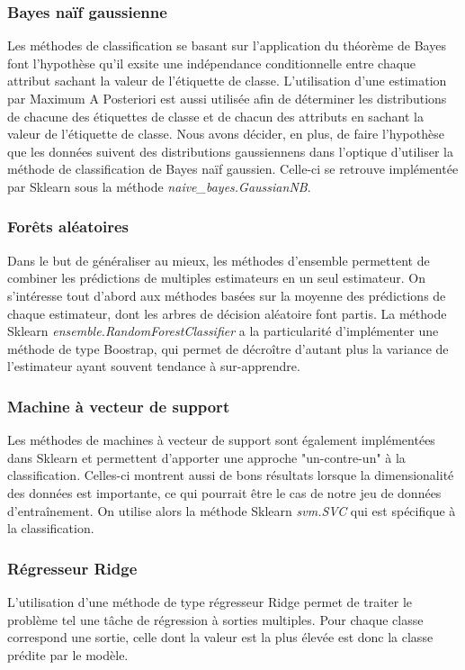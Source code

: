 \subsubsection*{Bayes naïf gaussienne}
Les méthodes de classification se basant sur l'application du théorème de Bayes font l'hypothèse qu'il exsite une indépendance conditionnelle entre chaque attribut sachant la valeur de l'étiquette de classe. L'utilisation d'une estimation par Maximum A Posteriori est aussi utilisée afin de déterminer les distributions de chacune des étiquettes de classe et de chacun des attributs en sachant la valeur de l'étiquette de classe. Nous avons décider, en plus, de faire l'hypothèse que les données suivent des distributions gaussiennens dans l'optique d'utiliser la méthode de classification de Bayes naïf gaussien. Celle-ci se retrouve implémentée par Sklearn sous la méthode \emph{naive\_bayes.GaussianNB}.

\subsubsection*{Forêts aléatoires}
Dans le but de généraliser au mieux, les méthodes d'ensemble permettent de combiner les prédictions de multiples estimateurs en un seul estimateur. On s'intéresse tout d'abord aux méthodes basées sur la moyenne des prédictions de chaque estimateur, dont les arbres de décision aléatoire font partis. 
La méthode Sklearn \emph{ensemble.RandomForestClassifier} a la particularité d'implémenter une méthode de type Boostrap, qui permet de décroître d'autant plus la variance de l'estimateur ayant souvent tendance à sur-apprendre.

\subsubsection*{Machine à vecteur de support}
Les méthodes de machines à vecteur de support sont également implémentées dans Sklearn et permettent d'apporter une approche "un-contre-un" à la classification. Celles-ci montrent aussi de bons résultats lorsque la dimensionalité des données est importante, ce qui pourrait être le cas de notre jeu de données d'entraînement. On utilise alors la méthode Sklearn \emph{svm.SVC} qui est spécifique à la classification.

\subsubsection*{Régresseur Ridge}
L'utilisation d'une méthode de type régresseur Ridge permet de traiter le problème tel une tâche de régression à sorties multiples. Pour chaque classe correspond une sortie, celle dont la valeur est la plus élevée est donc la classe prédite par le modèle.